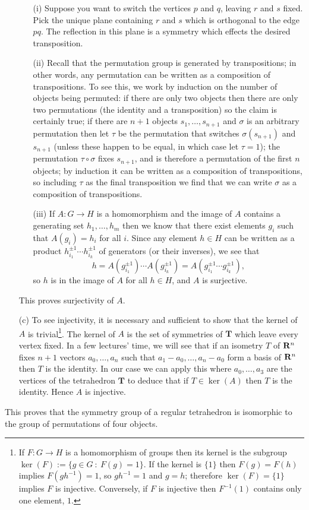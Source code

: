 \documentclass[12pt]{article}
\begin{document}
\begin{exm}
\begin{enumerate}
\begin{enumerate}
\item[(i)] Suppose you want to switch the vertices $p$ and $q$, leaving $r$ and $s$ fixed. Pick the unique plane containing $r$ and $s$ which is orthogonal to the edge $pq$. The reflection in this plane is a symmetry which effects the desired transposition.
\item[(ii)] Recall that the permutation group is generated by transpositions; in other words, any permutation can be written as a composition of transpositions. To see this, we work by induction on the number of objects being permuted: if there are only two objects then there are only two permutations (the identity and a transposition) so the claim is certainly true; if there are $n+1$ objects $s_1,\ldots,s_{n+1}$ and $\sigma$ is an arbitrary permutation then let $\tau$ be the permutation that switches $\sigma(s_{n+1})$ and $s_{n+1}$ (unless these happen to be equal, in which case let $\tau=1$); the permutation $\tau\circ\sigma$ fixes $s_{n+1}$, and is therefore a permutation of the first $n$ objects; by induction it can be written as a composition of transpositions, so including $\tau$ as the final transposition we find that we can write $\sigma$ as a composition of transpositions.
\item[(iii)] If $A\colon G\to H$ is a homomorphism and the image of $A$ contains a generating set $h_1,\ldots,h_m$ then we know that there exist elements $g_i$ such that $A(g_i)=h_i$ for all $i$. Since any element $h\in H$ can be written as a product $h_{i_1}^{\pm 1}\cdots h_{i_k}^{\pm 1}$ of generators (or their inverses), we see that
\[h=A(g_{i_1}^{\pm 1})\cdots A(g_{i_k}^{\pm 1})=A(g_{i_1}^{\pm 1}\cdots g_{i_k}^{\pm 1}),\]
so $h$ is in the image of $A$ for all $h\in H$, and $A$ is surjective.
\end{enumerate}
This proves surjectivity of $A$.

\item[(c)] To see injectivity, it is necessary and sufficient to show that the kernel of $A$ is trivial\footnote{If $F\colon G\to H$ is a homomorphism of groups then its kernel is the subgroup $\ker(F):=\{g\in G\ :\ F(g)=1\}$. If the kernel is $\{1\}$ then $F(g)=F(h)$ implies $F(gh^{-1})=1$, so $gh^{-1}=1$ and $g=h$; therefore $\ker(F)=\{1\}$ implies $F$ is injective. Conversely, if $F$ is injective then $F^{-1}(1)$ contains only one element, $1$.}. The kernel of $A$ is the set of symmetries of $\mathbf{T}$ which leave every vertex fixed. In a few lectures' time, we will see that if an isometry $T$ of $\mathbf{R}^n$ fixes $n+1$ vectors $a_0,\ldots,a_n$ such that $a_1-a_0,\ldots,a_n-a_0$ form a basis of $\mathbf{R}^n$ then $T$ is the identity. In our case we can apply this where $a_0,\ldots,a_3$ are the vertices of the tetrahedron $\mathbf{T}$ to deduce that if $T\in\ker(A)$ then $T$ is the identity. Hence $A$ is injective.
\end{enumerate}
This proves that the symmetry group of a regular tetrahedron is isomorphic to the group of permutations of four objects.
\end{exm}
\end{document}
